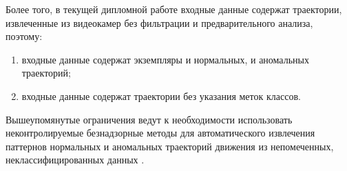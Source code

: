 Более того, в текущей дипломной работе входные данные содержат траектории, извлеченные из видеокамер без фильтрации и предварительного анализа, поэтому:

\begin{enumerate}
	\setlength\itemsep{-0.5em}
	\item входные данные содержат экземпляры и нормальных, и аномальных траекторий;
	\item входные данные содержат траектории без указания меток классов.
\end{enumerate}

Вышеупомянутые ограничения ведут к необходимости использовать неконтролируемые безнадзорные методы для автоматического извлечения паттернов нормальных и аномальных траекторий движения из непомеченных, неклассифицированных данных \cite{article:27_vna_cad_td}.
